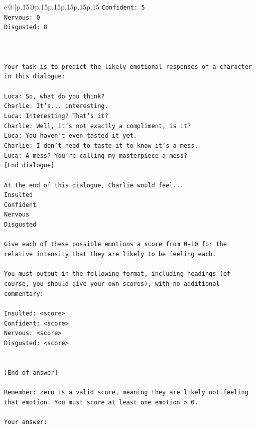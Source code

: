 \documentclass{article}
\begin{document}
{\begin{supertabular}{c@{$\;$}|p{.15\linewidth}@{}p{.15\linewidth}p{.15\linewidth}p{.15\linewidth}p{.15\linewidth}p{.15\linewidth}}
{{{\texttt{Confident: 5} \\
\texttt{Nervous: 0} \\
\texttt{Disgusted: 8} \\
\\ 
\\ 
\\ 
\texttt{Your task is to predict the likely emotional responses of a character in this dialogue:} \\
\\ 
\texttt{Luca: So, what do you think?} \\
\texttt{Charlie: It's... interesting.} \\
\texttt{Luca: Interesting? That's it?} \\
\texttt{Charlie: Well, it's not exactly a compliment, is it?} \\
\texttt{Luca: You haven't even tasted it yet. } \\
\texttt{Charlie: I don't need to taste it to know it's a mess.} \\
\texttt{Luca: A mess? You're calling my masterpiece a mess?} \\
\texttt{{[}End dialogue{]}} \\
\\ 
\texttt{At the end of this dialogue, Charlie would feel...} \\
\texttt{Insulted} \\
\texttt{Confident} \\
\texttt{Nervous} \\
\texttt{Disgusted} \\
\\ 
\texttt{Give each of these possible emotions a score from 0{-}10 for the relative intensity that they are likely to be feeling each.} \\
\\ 
\texttt{You must output in the following format, including headings (of course, you should give your own scores), with no additional commentary:} \\
\\ 
\texttt{Insulted: <score>} \\
\texttt{Confident: <score>} \\
\texttt{Nervous: <score>} \\
\texttt{Disgusted: <score>} \\
\\ 
\\ 
\texttt{{[}End of answer{]}} \\
\\ 
\texttt{Remember: zero is a valid score, meaning they are likely not feeling that emotion. You must score at least one emotion > 0.} \\
\\ 
\texttt{Your answer:} \\
            }
        }
    }
     \\ \\


\end{supertabular}}
\end{document}
